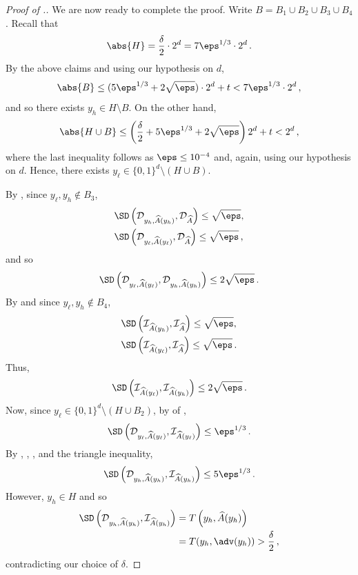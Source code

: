 \begin{proof}[Proof of .]
We are now ready to complete the proof. Write $B = B_1 \cup B_2 \cup B_3 \cup B_4$. Recall that \[\abs{H} = \frac{\delta}{2}\cdot 2^d = 7\eps^{1/3} \cdot 2^d\,.\]
By the above claims and using our hypothesis on $d$,
\[
\abs{B} \leq (5\eps^{1/3} + 2\sqrt{\eps})\cdot 2^d + t < 7\eps^{1/3} \cdot 2^d\,,
\]
and so there exists $y_h \in H \setminus B$.  On the other hand, 
\[
\abs{H \cup B} \le \left(\frac{\delta}{2} + 5\eps^{1/3} + 2\sqrt{\eps}  \right) 2^d + t < 2^d\,,
\]
where the last inequality follows as $\eps \leq 10^{-4}$ and, again, using our hypothesis on $d$. Hence, there exists $y_\ell \in \{0,1\}^d \setminus (H \cup B)$. 

By , since $y_\ell,y_h \notin B_3$,
\begin{align*}
&\SD\left(\mathcal{D}_{y_h,\widehat{A}(y_h)}, \mathcal{D}_{\widehat{A}} \right) \le \sqrt{\eps}, \\
&\SD\left(\mathcal{D}_{y_\ell,\widehat{A}(y_\ell)}, \mathcal{D}_{\widehat{A}} \right) \le \sqrt{\eps}\,,
\end{align*}
and so
\begin{equation}\label{eq:dldh}
\SD\left(\mathcal{D}_{y_\ell,\widehat{A}(y_\ell)}, \mathcal{D}_{y_h,\widehat{A}(y_h)}\right) \le 2\sqrt{\eps}\,.
\end{equation}
By  and since $y_\ell,y_h \notin B_4$,
\begin{align*}
&\SD\left(\mathcal{I}_{\widehat{A}(y_h)}, \mathcal{I}_{\widehat{A}} \right) \le \sqrt{\eps}, \\
&\SD\left(\mathcal{I}_{\widehat{A}(y_\ell)}, \mathcal{I}_{\widehat{A}} \right) \le \sqrt{\eps}\,.
\end{align*}
Thus,
\begin{equation}\label{eq:ilih}
\SD\left(\mathcal{I}_{\widehat{A}(y_\ell)}, \mathcal{I}_{\widehat{A}(y_h)} \right) \le 2\sqrt{\eps}\,.
\end{equation}
Now, since $y_\ell \in \{0,1\}^d \setminus (H \cup B_2)$, by  of ,
\begin{equation}\label{eq:dlil}
\SD\left(\mathcal{D}_{y_\ell,\widehat{A}(y_\ell)}, \mathcal{I}_{\widehat{A}(y_\ell)}\right) \le \eps^{1/3}\,.
\end{equation}
By , , , and the triangle inequality,
\[
\SD\left(\mathcal{D}_{y_h,\widehat{A}(y_h)}, \mathcal{I}_{\widehat{A}(y_h)}\right) \le 5 \eps^{1/3}\,.
\]
However, $y_h \in H$ and so
\begin{align*}
\SD\left( \mathcal{D}_{y_h,\widehat{A}(y_h)}, \mathcal{I}_{\widehat{A}(y_h)} \right) &= T\left(y_h,\widehat{A}(y_h)\right) \\
&= T(y_h, \adv(y_h)) > \frac{\delta}{2}\,,
\end{align*}
contradicting our choice of $\delta$.
\end{proof}

